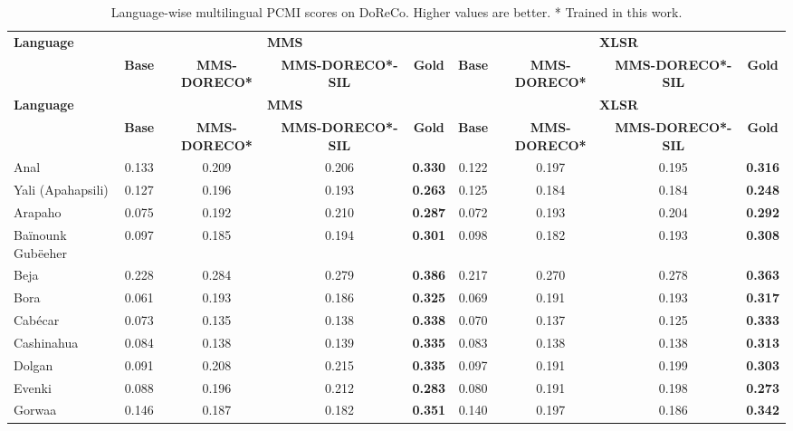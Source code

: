 \begingroup
\scriptsize
\setlength{\tabcolsep}{3pt}
\renewcommand{\arraystretch}{0.92}
\begin{longtable}{lcccccccc}
\caption{Language-wise multilingual PCMI scores on DoReCo. Higher values are better. * Trained in this work.}\label{tab:pcmi_table_doreco}\\
\toprule
\multirow{2}{*}{\textbf{Language}} & \multicolumn{4}{c}{\textbf{MMS}} & \multicolumn{4}{c}{\textbf{XLSR}} \\
\cmidrule(lr){2-5}\cmidrule(lr){6-9}
& \textbf{Base}& \textbf{MMS-DORECO*}& \textbf{MMS-DORECO*-SIL}& \textbf{Gold}& \textbf{Base}& \textbf{MMS-DORECO*}& \textbf{MMS-DORECO*-SIL}& \textbf{Gold}\\
\midrule
\endfirsthead
\toprule
\multirow{2}{*}{\textbf{Language}} & \multicolumn{4}{c}{\textbf{MMS}} & \multicolumn{4}{c}{\textbf{XLSR}} \\
\cmidrule(lr){2-5}\cmidrule(lr){6-9}
& \textbf{Base}& \textbf{MMS-DORECO*}& \textbf{MMS-DORECO*-SIL}& \textbf{Gold}& \textbf{Base}& \textbf{MMS-DORECO*}& \textbf{MMS-DORECO*-SIL}& \textbf{Gold}\\
\midrule
\endhead
\bottomrule
\endfoot
Anal & 0.133 & 0.209 & 0.206 & \textbf{0.330} & 0.122 & 0.197 & 0.195 & \textbf{0.316} \\
Yali (Apahapsili) & 0.127 & 0.196 & 0.193 & \textbf{0.263} & 0.125 & 0.184 & 0.184 & \textbf{0.248} \\
Arapaho & 0.075 & 0.192 & 0.210 & \textbf{0.287} & 0.072 & 0.193 & 0.204 & \textbf{0.292} \\
Baïnounk Gubëeher & 0.097 & 0.185 & 0.194 & \textbf{0.301} & 0.098 & 0.182 & 0.193 & \textbf{0.308} \\
Beja & 0.228 & 0.284 & 0.279 & \textbf{0.386} & 0.217 & 0.270 & 0.278 & \textbf{0.363} \\
Bora & 0.061 & 0.193 & 0.186 & \textbf{0.325} & 0.069 & 0.191 & 0.193 & \textbf{0.317} \\
Cabécar & 0.073 & 0.135 & 0.138 & \textbf{0.338} & 0.070 & 0.137 & 0.125 & \textbf{0.333} \\
Cashinahua & 0.084 & 0.138 & 0.139 & \textbf{0.335} & 0.083 & 0.138 & 0.138 & \textbf{0.313} \\
Dolgan & 0.091 & 0.208 & 0.215 & \textbf{0.335} & 0.097 & 0.191 & 0.199 & \textbf{0.303} \\
Evenki & 0.088 & 0.196 & 0.212 & \textbf{0.283} & 0.080 & 0.191 & 0.198 & \textbf{0.273} \\
Gorwaa & 0.146 & 0.187 & 0.182 & \textbf{0.351} & 0.140 & 0.197 & 0.186 & \textbf{0.342} \\

\end{longtable}
